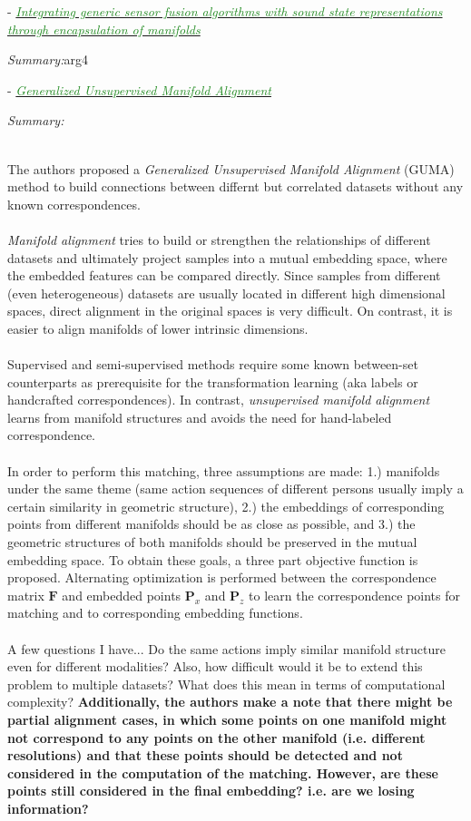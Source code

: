 \documentclass[]{article}
\newcommand{\paperentry}[4]{
            \hangindent=1cm
            \cite{#1} - \href{run:../References/#3}{\textcolor{ForestGreen}{\textit{#2}}}
            
            \noindent            
            \begin{minipage}[t]{0.1\linewidth}\hfill\end{minipage}
            \begin{minipage}[t]{0.8\linewidth}\textcolor{NavyBlue}{{\textit{Summary:}}}#4\end{minipage}
            \vspace{.25cm}
          }
\begin{document}
		\paperentry{Hertzberg2013SensorFusionStateRepManifolds}
		{Integrating generic sensor fusion algorithms with sound state representations through encapsulation of manifolds}
		{Manifold_Representation_Learning/Alignment/Hertzberg2013SensorFusionStateRepManifolds.pdf}
		{arg4}
		
		\paperentry{Cui2014GenUnsupManifoldAlignment}
		{Generalized Unsupervised Manifold Alignment}
		{Manifold_Representation_Learning/AlignmentCui2014GenUnsupManifoldAlignment/.pdf}
		{}\\
		The authors proposed a \textit{Generalized Unsupervised Manifold Alignment} (GUMA) method to build connections between differnt but correlated datasets without any known correspondences.
		\\ \\
		\textit{Manifold alignment} tries to build or strengthen the relationships of different datasets and ultimately project samples into a mutual embedding space, where the embedded features can be compared directly.  Since samples from different (even heterogeneous) datasets are usually located in different high dimensional spaces, direct alignment in the original spaces is very difficult.  On contrast, it is easier to align manifolds of lower intrinsic dimensions.
		\\ \\
		Supervised and semi-supervised methods require some known between-set counterparts as prerequisite for the transformation learning (aka labels or handcrafted correspondences).  In contrast, \textit{unsupervised manifold alignment} learns from manifold structures and avoids the need for hand-labeled correspondence.
		\\ \\
		In order to perform this matching, three assumptions are made: 1.) manifolds under the same theme (same action sequences of different persons usually imply a certain similarity in geometric structure), 2.) the embeddings of corresponding points from different manifolds should be as close as possible, and 3.) the geometric structures of both manifolds should be preserved in the mutual embedding space.  To obtain these goals, a three part objective function  is proposed.  Alternating optimization is performed between the correspondence matrix $\bm{F}$ and embedded points $\bm{P}_{x}$ and $\bm{P}_{z}$ to learn the correspondence points for matching and to corresponding embedding functions.
		\\ \\
		A few questions I have... Do the same actions imply similar manifold structure even for different modalities?  Also, how difficult would it be to extend this problem to multiple datasets?  What does this mean in terms of computational complexity? \textbf{Additionally, the authors make a note that there might be partial alignment cases, in which some points on one manifold might not correspond to any points on the other manifold (i.e. different resolutions) and that these points should be detected and not considered in the computation of the matching.  However, are these points still considered in the final embedding? i.e. are we losing information?}\\
		
\end{document}
